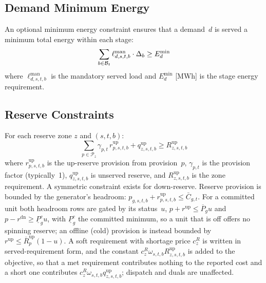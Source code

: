 \subsection{Demand Minimum Energy}

An optional minimum energy constraint ensures that a demand~$d$ is
served a minimum total energy within each stage:
\begin{equation}
\label{eq:min_energy}
\sum_{b \in \mathcal{B}_t} \ell^\text{man}_{d,s,t,b} \cdot \Delta_b
  \geq E_d^\text{min}
\end{equation}
where $\ell^\text{man}_{d,s,t,b}$ is the mandatory served load and
$E_d^\text{min}$ [MWh] is the stage energy requirement.

\subsection{Reserve Constraints}
\label{sec:reserve}

For each reserve zone $z$ and $(s,t,b)$:
\begin{equation}
\label{eq:reserve_up}
\sum_{p \in \mathcal{P}_z} \gamma_{p,t} \, r^\text{up}_{p,s,t,b}
  + q^\text{up}_{z,s,t,b}
  \geq R^\text{up}_{z,s,t,b}
\end{equation}
where $r^\text{up}_{p,s,t,b}$ is the up-reserve provision from
provision~$p$, $\gamma_{p,t}$ is the provision factor (typically~1),
$q^\text{up}_{z,s,t,b}$ is unserved reserve, and
$R^\text{up}_{z,s,t,b}$ is the zone requirement.  A symmetric constraint
exists for down-reserve.  Reserve provision is bounded by the generator's
headroom: $p_{g,s,t,b} + r^\text{up}_{p,s,t,b} \leq \bar{C}_{g,t}$.
For a committed unit both headroom rows are gated by its status~$u$,
$p + r^\text{up} \leq \overline{P}_g u$ and
$p - r^\text{dn} \geq \underline{P}^c_g u$, with $\underline{P}^c_g$ the
committed minimum, so a unit that is off offers no spinning reserve;
an offline (cold) provision is instead bounded by
$r^\text{up} \leq \overline{R}^\text{up}_p (1-u)$.  A soft requirement
with shortage price $c^R_z$ is written in served-requirement form, and
the constant $c^R_z \omega_{s,t,b} R^\text{up}_{z,s,t,b}$ is added to
the objective, so that a met requirement contributes nothing to the
reported cost and a short one contributes $c^R_z \omega_{s,t,b}
q^\text{up}_{z,s,t,b}$; dispatch and duals are unaffected.

